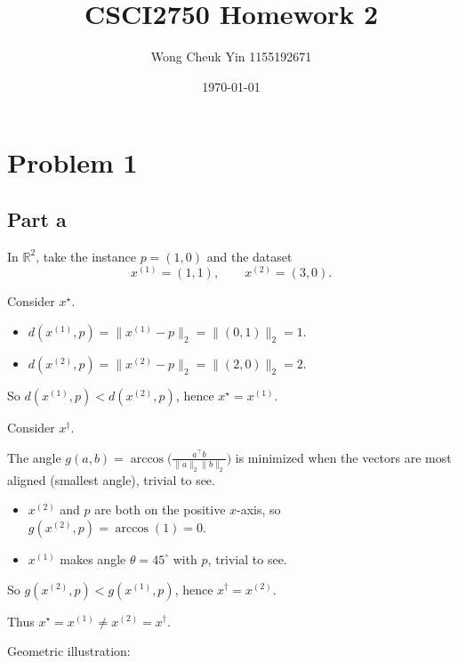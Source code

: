 \documentclass{article}
\title{CSCI2750 Homework 2}
\author{Wong Cheuk Yin 1155192671}
\date{\today}
\begin{document}
    \maketitle
    \section{Problem 1}
    \subsection{Part a}

    In $\mathbb{R}^2$, take the instance $p = (1, 0)$ and the dataset
    \[
        x^{(1)} = (1, 1), \qquad x^{(2)} = (3, 0).
    \]

    \noindent Consider $x^\star$.
    \begin{itemize}
        \item $d(x^{(1)}, p) = \|x^{(1)} - p\|_2 = \|(0, 1)\|_2 = 1$.
        \item $d(x^{(2)}, p) = \|x^{(2)} - p\|_2 = \|(2, 0)\|_2 = 2$.
    \end{itemize}
    So $d(x^{(1)}, p) < d(x^{(2)}, p)$, hence $x^\star = x^{(1)}$.

    \bigskip
    \noindent Consider $x^\dagger$.

    \medskip
    \noindent The angle $g(a,b) = \arccos\bigl(\frac{a^\top b}{\|a\|_2\|b\|_2}\bigr)$ is minimized when the vectors are most aligned (smallest angle), trivial to see.
    \begin{itemize}
        \item $x^{(2)}$ and $p$ are both on the positive $x$-axis, so $g(x^{(2)}, p) = \arccos(1) = 0$.
        \item $x^{(1)}$ makes angle $\theta = 45^\circ$ with $p$, trivial to see.
    \end{itemize}
    So $g(x^{(2)}, p) < g(x^{(1)}, p)$, hence $x^\dagger = x^{(2)}$.

    \bigskip
    \noindent Thus $x^\star = x^{(1)} \neq x^{(2)} = x^\dagger$.

    \bigskip
    \noindent Geometric illustration: 
    \medskip
    \begin{center}
    \end{center}
\end{document}
